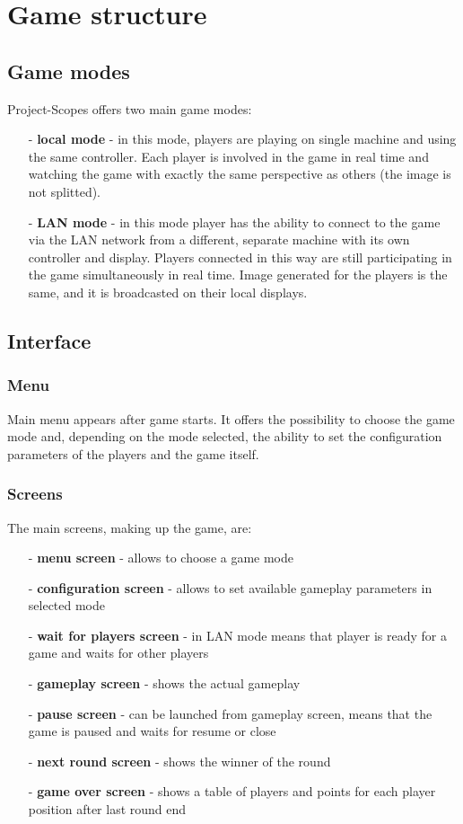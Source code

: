 \section{Game structure}

\subsection{Game modes}
\noindent Project-Scopes offers two main game modes:
\begin{itemize}
	\item[-] \textbf{local mode} - in this mode, players are playing on single machine and using the same controller. Each player is involved in the game in real time and watching the game with exactly the same perspective as others (the image is not splitted).
	\item[-] \textbf{LAN mode} - in this mode player has the ability to connect to the game via the LAN network from a different, separate machine with its own controller and display. Players connected in this way are still participating in the game simultaneously in real time. Image generated for the players is the same, and it is broadcasted on their local displays.
\end{itemize}

\subsection{Interface}

\subsubsection{Menu}
\noindent Main menu appears after game starts. It offers the possibility to choose the game mode and, depending on the mode selected, the ability to set the configuration parameters of the players and the game itself.

\subsubsection{Screens}
\noindent The main screens, making up the game, are:
\begin{itemize}
	\item[-] \textbf{menu screen} - allows to choose a game mode
	\item[-] \textbf{configuration screen} - allows to set available gameplay parameters in selected mode
	\item[-] \textbf{wait for players screen} - in LAN mode means that player is ready for a game and waits for other players
	\item[-] \textbf{gameplay screen} - shows the actual gameplay
	\item[-] \textbf{pause screen} - can be launched from gameplay screen, means that the game is paused and waits for resume or close
	\item[-] \textbf{next round screen} - shows the winner of the round
	\item[-] \textbf{game over screen} - shows a table of players and points for each player position after last round end
\end{itemize}

